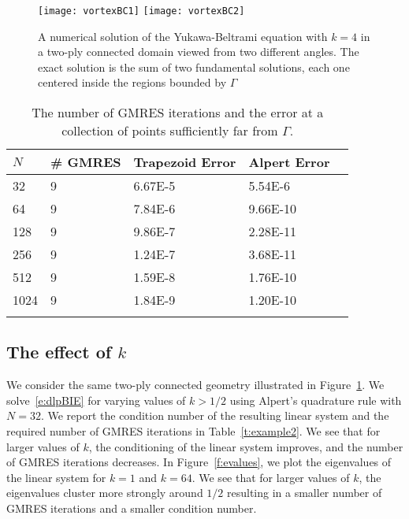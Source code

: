 \begin{figure}[htps]
  \texttt{[image: vortexBC1]}
  \texttt{[image: vortexBC2]}
\caption{\label{f:twoply} A numerical solution of the Yukawa-Beltrami
equation with $k=4$ in a two-ply connected domain viewed from two
different angles.  The exact solution is the sum of two fundamental
solutions, each one centered inside the regions bounded by $\Gamma$}
\end{figure}

\begin{table}[htps]
\caption{\label{t:example1} The number of GMRES iterations and the
error at a collection of points sufficiently far from $\Gamma$.}
\centering
\begin{tabular*}{0.8\textwidth}{@{\extracolsep{\fill}}lllll}
$N$ & \# GMRES & Trapezoid Error & Alpert Error  \\
\hline\noalign{\smallskip}
32   & 9 & 6.67E-5 & 5.54E-6  \\
64   & 9 & 7.84E-6 & 9.66E-10 \\
128  & 9 & 9.86E-7 & 2.28E-11 \\
256  & 9 & 1.24E-7 & 3.68E-11 \\
512  & 9 & 1.59E-8 & 1.76E-10 \\  
1024 & 9 & 1.84E-9 & 1.20E-10 \\ 
\noalign{\smallskip}\hline
\end{tabular*}
\end{table}

\subsection{The effect of $k$}
We consider the same two-ply connected geometry illustrated in
Figure~\ref{f:twoply}.  We solve~\eqref{e:dlpBIE} for varying values of
$k > 1/2$ using Alpert's quadrature rule with $N=32$.  We report the
condition number of the resulting linear system and the required number
of GMRES iterations in Table~\ref{t:example2}.  We see that for larger
values of $k$, the conditioning of the linear system improves, and the
number of GMRES iterations decreases.  In Figure~\ref{f:evalues}, we
plot the eigenvalues of the linear system for $k=1$ and $k=64$.  We see
that for larger values of $k$, the eigenvalues cluster more strongly
around $1/2$ resulting in a smaller number of GMRES iterations and a
smaller condition number.

